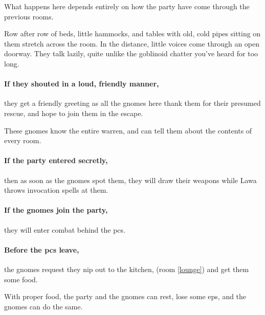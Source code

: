 \begin{multicols}{2}
What happens here depends entirely on how the party have come through the previous rooms.

\begin{boxtext}
  Row after row of beds, little hammocks, and tables with old, cold pipes sitting on them stretch across the room.
  In the distance, little voices come through an open doorway.
  They talk lazily, quite unlike the goblinoid chatter you've heard for too long.
\end{boxtext}

\paragraph{If they shouted in a loud, friendly manner,}
they get a friendly greeting as all the gnomes here thank them for their presumed rescue, and hope to join them in the escape.

These gnomes know the entire \gls{warren}, and can tell them about the contents of every room.

\paragraph{If the party entered secretly,}
then as soon as the gnomes spot them, they will draw their weapons while Lawa throws invocation spells at them.

\paragraph{If the gnomes join the party,}
they will enter combat behind the \glspl{pc}.

\paragraph{Before the \glspl{pc} leave,}
the gnomes request they nip out to the kitchen, (room \ref{lounge}) and get them some food.

With proper food, the party and the gnomes can rest, lose some \glspl{ep}, and the gnomes can do the same.







\end{multicols}
